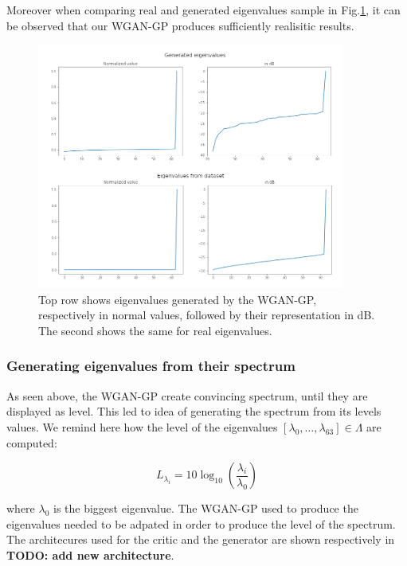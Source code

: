 \documentclass{article}
\begin{document}
Moreover when comparing real  and generated eigenvalues sample in Fig.\ref{fig:real_vs_generated_evals}, it can be observed that our WGAN-GP produces sufficiently realisitic results. 

\begin{figure}
    \centering
    \includegraphics[width=0.9\textwidth]{../figs/real_vs_generated_evals.png}    
    \caption{Top row shows eigenvalues generated by the WGAN-GP, respectively in normal values, followed by their representation in dB. The second shows the same for real eigenvalues.
    }
    \label{fig:real_vs_generated_evals}
\end{figure}

\subsubsection{Generating eigenvalues from their spectrum}

As seen above, the WGAN-GP create convincing spectrum, until they are displayed as level. This led to idea of generating the spectrum from its levels values. We remind here how the level of the eigenvalues $[\lambda_0, \dots, \lambda_{63}] \in \Lambda$ are computed:

\begin{equation}
    L_{\lambda_i} = 10 \log_{10}(\frac{\lambda_i}{\lambda_0})
\end{equation}

where $\lambda_0$ is the biggest eigenvalue. The WGAN-GP used to produce the eigenvalues needed to be adpated in order to produce the level of the spectrum. The architecures  used for the critic and the generator are shown respectively in \textbf{TODO: add new architecture}.
\end{document}
